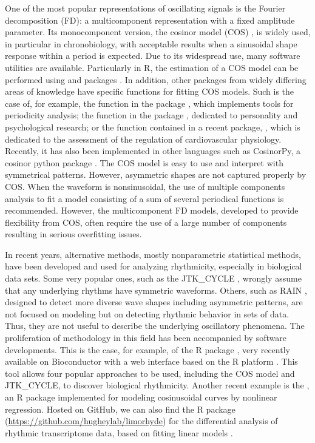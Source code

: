 One of the most popular representations of oscillating signals is the Fourier decomposition (FD): a multicomponent representation with a fixed amplitude parameter. Its monocomponent version, the cosinor model (COS) \citep{Cornelissen:2014}, is widely used, in particular in chronobiology, with acceptable results when a sinusoidal shape response within a period is expected. Due to its widespread use, many software utilities are available. Particularly in R, the estimation of a COS model can be performed using  \citep{Sachs:2014} and  packages \citep{Mutak:2018}. In addition, other packages from widely differing areas of knowledge have specific functions for fitting COS models. Such is the case of, for example, the function  in the  package \citep{Gierke+Helget+Cronelissen:2018}, which implements tools for periodicity analysis; the function  in the  package \citep{Revelle:2018}, dedicated to personality and psychological research; or the function  contained in a recent package,  \citep{Shah:2020}, which is dedicated to the assessment of the regulation of cardiovascular physiology. Recently, it has also been implemented in other languages such as CosinorPy, a cosinor python package \citep{Moskon:2020}. The COS model is easy to use and interpret with symmetrical patterns. However, asymmetric shapes are not captured properly by COS. When the waveform is nonsinusoidal, the use of multiple components analysis to fit a model consisting of a sum of several periodical functions is recommended. However, the multicomponent FD models, developed to provide flexibility from COS, often require the use of a large number of components resulting in serious overfitting issues. 

In recent years, alternative methods, mostly nonparametric statistical methods, have been developed and used for analyzing rhythmicity, especially in biological data sets. Some very popular ones, such as the JTK\_CYCLE \citep{Hughes+Hogenesch+Kornacker:2010}, wrongly assume that any underlying rhythms have symmetric waveforms. Others, such as RAIN \citep{Thaben+Westermark:2014}, designed to detect more diverse wave shapes including asymmetric patterns, are not focused on modeling but on detecting rhythmic behavior in sets of data. Thus, they are not useful to describe the underlying oscillatory phenomena. The proliferation of methodology in this field has been accompanied by software developments. This is the case, for example, of the  R package \citep{Calucci+Kris+Li+al:2020}, very recently available on Bioconductor with a web interface based on the R  platform \citep{Chang+Cheng+Allaire+etal:2021}. This tool allows four popular approaches to be used, including the COS model and JTK\_CYCLE, to discover biological rhythmicity. Another recent example is the  \citep{Parsons+Garner+Oster+Rawashdeh:2020}, an R package implemented for modeling cosinusoidal curves by nonlinear regression. Hosted on GitHub, we can also find the  R package (\url{https://github.com/hugheylab/limorhyde}) for the differential analysis of rhythmic transcriptome data, based on fitting linear models \citep{Singer+Hughey:2019}. 


